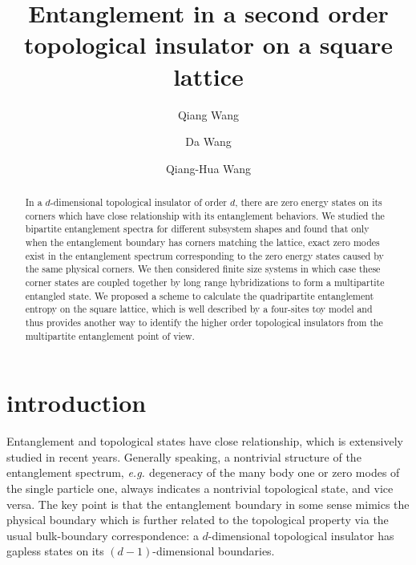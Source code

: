 \documentclass[twocolumn,superscriptaddress]{revtex4-1}
\newcommand{\eg}{\textit{e.g.{ }}}
\begin{document}
\title{Entanglement in a second order topological insulator on a square lattice}
\author{Qiang Wang}
\author{Da Wang} %
\author{Qiang-Hua Wang} %

\begin{abstract}
  In a $d$-dimensional topological insulator of order $d$, there are zero energy states on its corners which have close relationship with its entanglement behaviors. We studied the bipartite entanglement spectra for different subsystem shapes and found that only when the entanglement boundary has corners matching the lattice, exact zero modes exist in the entanglement spectrum corresponding to the zero energy states caused by the same physical corners. We then considered finite size systems in which case these corner states are coupled together by long range hybridizations to form a multipartite entangled state. We proposed a scheme to calculate the quadripartite entanglement entropy on the square lattice, which is well described by a four-sites toy model and thus provides another way to identify the higher order topological insulators from the multipartite entanglement point of view.
\end{abstract}
\maketitle
\section{introduction}
Entanglement and topological states have close relationship, which is extensively studied in recent years. \cite{Kitaev_PRL_2006, Levin_PRL_2006, Ryu_PRB_2006, Li_PRL_2008, Fidkowski_PRL_2010, Pollmann_PRB_2010, Yao_PRL_2010a, Turner_PRB_2011, Zhang_PRL_2011, Huang_PRB_2012, Qi_PRL_2012, Jiang_PRL_2013, Chandran_PRL_2014, Wang_PRB_2015e, Zeng_a_2015, Laflorencie_PR_2016, Koch-Janusz_PRB_2017} Generally speaking, a nontrivial structure of the entanglement spectrum, \eg degeneracy of the many body one or zero modes of the single particle one, always indicates a nontrivial topological state, and vice versa. \cite{Ryu_PRB_2006, Li_PRL_2008, Fidkowski_PRL_2010, Qi_PRL_2012} The key point is that the entanglement boundary in some sense mimics the physical boundary which is further related to the topological property via the usual bulk-boundary correspondence: a $d$-dimensional topological insulator has gapless states on its $(d-1)$-dimensional boundaries. \cite{Hatsugai_PRL_1993, Qi_PRB_2006, Qi_PRB_2008, Schnyder_PRB_2008}
\end{document}
